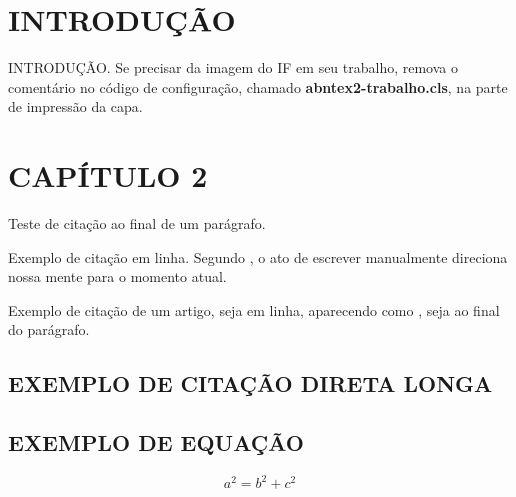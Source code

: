 \documentclass[
    12pt,				%
    a4paper,            %
    oneside,			%
    openright,			%
    ruledheader,
    anapcustomindent,
    sumario = tradicional,
    abntfigtabnum,
    tocpage=plain,
    english,			%
	brazil,				%
    ]{abntex-ifsuldeminas/abntex2-trabalho} %
\begin{document}
\renewcommand{\contentsname}{SUM\'ARIO} %
\pdfbookmark[0]{\contentsname}{toc}
\tableofcontents*
\cleardoublepage

\textual


\chapter{INTRODUÇÃO}
\thispagestyle{empty} %
    
    INTRODUÇÃO. Se precisar da imagem do IF em seu trabalho, remova o comentário no código de configuração, chamado \textbf{abntex2-trabalho.cls}, na parte de impressão da capa.
    

\chapter{CAPÍTULO 2}
    
    Teste de citação ao final de um parágrafo. \cite{monico_posicionamento_2007}
    
    Exemplo de citação em linha. Segundo \textcite{carroll_2018}, o ato de escrever manualmente direciona nossa mente para o momento atual.
    
    Exemplo de citação de um artigo, seja em linha, aparecendo como \textcite{silva_evolucao_2015}, seja ao final do parágrafo. \cite{silva_evolucao_2015}
    
    \section{EXEMPLO DE CITAÇÃO DIRETA LONGA}
    
    \begin{citacao}
    \lipsum[1]
    \end{citacao}
    
    \section{EXEMPLO DE EQUAÇÃO}
    \begin{equation}
        \label{eq:pitagoras}
        a^2 = b^2 + c^2
    \end{equation}
    
\end{document}
